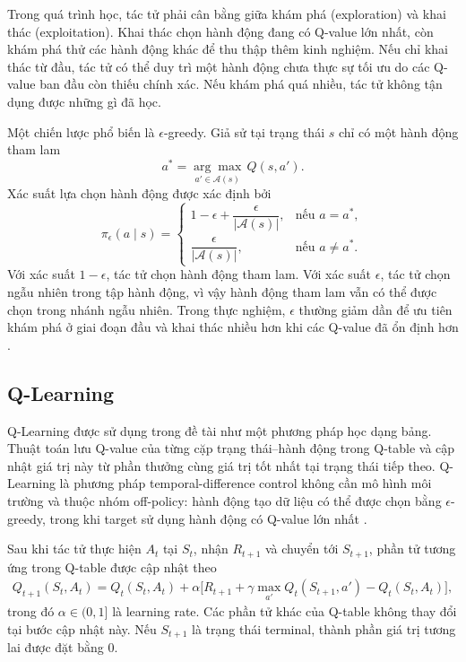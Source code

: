 Trong quá trình học, tác tử phải cân bằng giữa khám phá (exploration) và khai thác (exploitation). Khai thác chọn hành động đang có Q-value lớn nhất, còn khám phá thử các hành động khác để thu thập thêm kinh nghiệm. Nếu chỉ khai thác từ đầu, tác tử có thể duy trì một hành động chưa thực sự tối ưu do các Q-value ban đầu còn thiếu chính xác. Nếu khám phá quá nhiều, tác tử không tận dụng được những gì đã học.

Một chiến lược phổ biến là $\epsilon$-greedy. Giả sử tại trạng thái $s$ chỉ có một hành động tham lam
\begin{equation}
    a^{*}
    =
    \underset{a' \in \mathcal{A}(s)}{\arg\max}\,Q(s,a').
    \label{eq:greedy-action}
\end{equation}
Xác suất lựa chọn hành động được xác định bởi
\begin{equation}
    \pi_{\epsilon}(a \mid s)
    =
    \begin{cases}
        1-\epsilon+\dfrac{\epsilon}{|\mathcal{A}(s)|},
        & \text{nếu } a=a^{*},\\[6pt]
        \dfrac{\epsilon}{|\mathcal{A}(s)|},
        & \text{nếu } a\neq a^{*}.
    \end{cases}
    \label{eq:epsilon-greedy}
\end{equation}
Với xác suất $1-\epsilon$, tác tử chọn hành động tham lam. Với xác suất $\epsilon$, tác tử chọn ngẫu nhiên trong tập hành động, vì vậy hành động tham lam vẫn có thể được chọn trong nhánh ngẫu nhiên. Trong thực nghiệm, $\epsilon$ thường giảm dần để ưu tiên khám phá ở giai đoạn đầu và khai thác nhiều hơn khi các Q-value đã ổn định hơn \cite{SuttonBarto2018}.

\subsection{Q-Learning}

Q-Learning được sử dụng trong đề tài như một phương pháp học dạng bảng. Thuật toán lưu Q-value của từng cặp trạng thái--hành động trong Q-table và cập nhật giá trị này từ phần thưởng cùng giá trị tốt nhất tại trạng thái tiếp theo. Q-Learning là phương pháp temporal-difference control không cần mô hình môi trường và thuộc nhóm off-policy: hành động tạo dữ liệu có thể được chọn bằng $\epsilon$-greedy, trong khi target sử dụng hành động có Q-value lớn nhất \cite{WatkinsDayan1992,SuttonBarto2018}.

Sau khi tác tử thực hiện $A_t$ tại $S_t$, nhận $R_{t+1}$ và chuyển tới $S_{t+1}$, phần tử tương ứng trong Q-table được cập nhật theo
\begin{equation}
    \begin{aligned}
    Q_{t+1}(S_t,A_t)
    =
    Q_t(S_t,A_t)
    + \alpha
    \Big[
        R_{t+1}
        + \gamma \max_{a'}Q_t(S_{t+1},a')
        - Q_t(S_t,A_t)
    \Big],
    \end{aligned}
    \label{eq:q-learning-update}
\end{equation}
trong đó $\alpha \in (0,1]$ là learning rate. Các phần tử khác của Q-table không thay đổi tại bước cập nhật này. Nếu $S_{t+1}$ là trạng thái terminal, thành phần giá trị tương lai được đặt bằng $0$.

